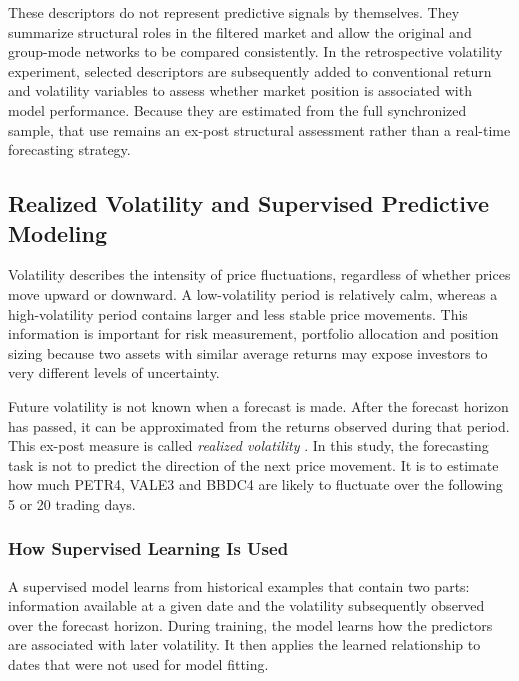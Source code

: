 These descriptors do not represent predictive signals by themselves. They summarize structural roles in the filtered market and allow the original and group-mode networks to be compared consistently. In the retrospective volatility experiment, selected descriptors are subsequently added to conventional return and volatility variables to assess whether market position is associated with model performance. Because they are estimated from the full synchronized sample, that use remains an ex-post structural assessment rather than a real-time forecasting strategy.

\subsection{Realized Volatility and Supervised Predictive Modeling}
\label{subsec:theory_volatility}

Volatility describes the intensity of price fluctuations, regardless of whether prices move upward or downward. A low-volatility period is relatively calm, whereas a high-volatility period contains larger and less stable price movements. This information is important for risk measurement, portfolio allocation and position sizing because two assets with similar average returns may expose investors to very different levels of uncertainty.

Future volatility is not known when a forecast is made. After the forecast horizon has passed, it can be approximated from the returns observed during that period. This ex-post measure is called \emph{realized volatility} \cite{andersen_2003_modeling}. In this study, the forecasting task is not to predict the direction of the next price movement. It is to estimate how much PETR4, VALE3 and BBDC4 are likely to fluctuate over the following 5 or 20 trading days.

\subsubsection{How Supervised Learning Is Used}
A supervised model learns from historical examples that contain two parts: information available at a given date and the volatility subsequently observed over the forecast horizon. During training, the model learns how the predictors are associated with later volatility. It then applies the learned relationship to dates that were not used for model fitting.

